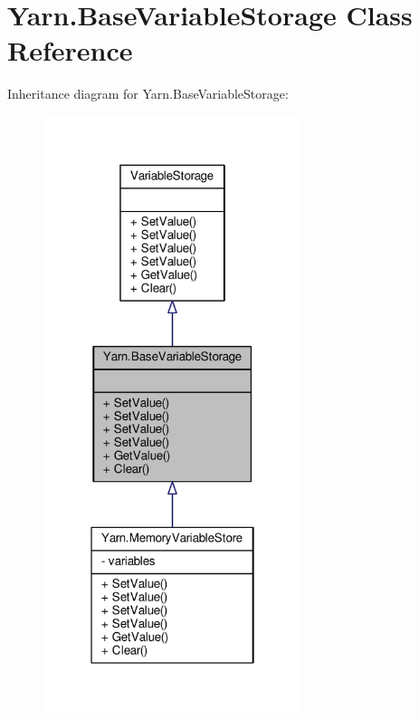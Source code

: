 \hypertarget{a00043}{\section{Yarn.\-Base\-Variable\-Storage Class Reference}
\label{a00043}
}


Inheritance diagram for Yarn.\-Base\-Variable\-Storage\-:
\nopagebreak
\begin{figure}[H]
\begin{center}
\leavevmode
\includegraphics[width=214pt]{a00582}
\end{center}
\end{figure}


